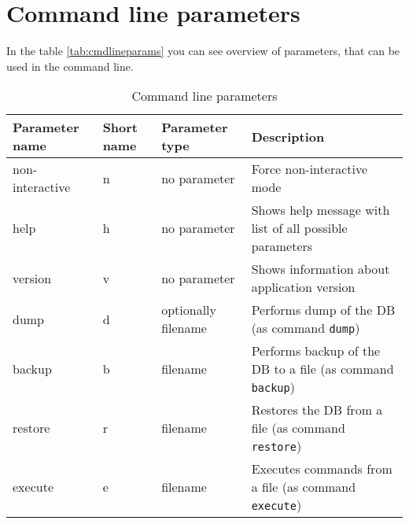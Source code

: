 \documentclass[deska]{subfiles}
\begin{document}
\section{Command line parameters}

In the table \ref{tab:cmdlineparams} you can see overview of parameters, that can be used in the command line.

\label{tab:cmdlineparams}
\begin{longtable}{ l | l | l | p{7cm} }
    \caption{Command line parameters} \\
    Parameter name & Short name & Parameter type & Description \\
    \hline
    \endhead
    non-interactive & n & no parameter & Force non-interactive mode \\
    help & h & no parameter & Shows help message with list of all possible parameters \\
    version & v & no parameter & Shows information about application version \\
    dump & d & optionally filename & Performs dump of the DB (as command {\tt dump}) \\
    backup & b & filename & Performs backup of the DB to a file (as command {\tt backup}) \\
    restore & r & filename & Restores the DB from a file (as command {\tt restore}) \\
    execute & e & filename & Executes commands from a file (as command {\tt execute}) \\
    \hline
\end{longtable}
\end{document}
